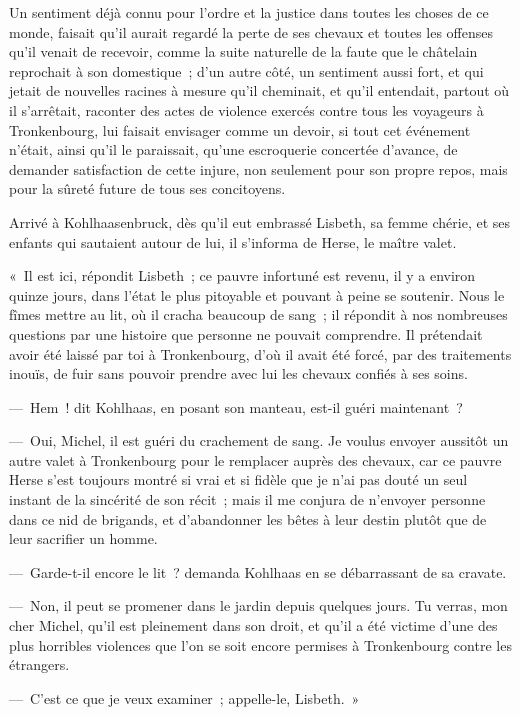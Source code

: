 \documentclass[french,twoside]{book} %
\begin{document}
Un sentiment déjà connu pour l’ordre et la justice dans toutes les choses de ce monde, faisait qu’il aurait regardé la perte de ses chevaux et toutes les offenses qu’il venait de recevoir, comme la suite naturelle de la faute que le châtelain reprochait à son domestique ; d’un autre côté, un sentiment aussi fort, et qui jetait de nouvelles racines à mesure qu’il cheminait, et qu’il entendait, partout où il s’arrêtait, raconter des actes de violence exercés contre tous les voyageurs à Tronkenbourg, lui faisait envisager comme un devoir, si tout cet événement n’était, ainsi qu’il le paraissait, qu’une escroquerie concertée d’avance, de demander satisfaction de cette injure, non seulement pour son propre repos, mais pour la sûreté future de tous ses concitoyens.\par
Arrivé à Kohlhaasenbruck, dès qu’il eut embrassé Lisbeth, sa femme chérie, et ses enfants qui sautaient autour de lui, il s’informa de Herse, le maître valet.\par
« Il est ici, répondit Lisbeth ; ce pauvre infortuné est revenu, il y a environ quinze jours, dans l’état le plus pitoyable et pouvant à peine se soutenir. Nous le fîmes mettre au lit, où il cracha beaucoup de sang ; il répondit à nos nombreuses questions par une histoire que personne ne pouvait comprendre. Il prétendait avoir été laissé par toi à Tronkenbourg, d’où il avait été forcé, par des traitements inouïs, de fuir sans pouvoir prendre avec lui les chevaux confiés à ses soins.\par
— Hem ! dit Kohlhaas, en posant son manteau, est-il guéri maintenant ?\par
— Oui, Michel, il est guéri du crachement de sang. Je voulus envoyer aussitôt un autre valet à Tronkenbourg pour le remplacer auprès des chevaux, car ce pauvre Herse s’est toujours montré si vrai et si fidèle que je n’ai pas douté un seul instant de la sincérité de son récit ; mais il me conjura de n’envoyer personne dans ce nid de brigands, et d’abandonner les bêtes à leur destin plutôt que de leur sacrifier un homme.\par
— Garde-t-il encore le lit ? demanda Kohlhaas en se débarrassant de sa cravate.\par
— Non, il peut se promener dans le jardin depuis quelques jours. Tu verras, mon cher Michel, qu’il est pleinement dans son droit, et qu’il a été victime d’une des plus horribles violences que l’on se soit encore permises à Tronkenbourg contre les étrangers.\par
— C’est ce que je veux examiner ; appelle-le, Lisbeth. »\par
\end{document}
